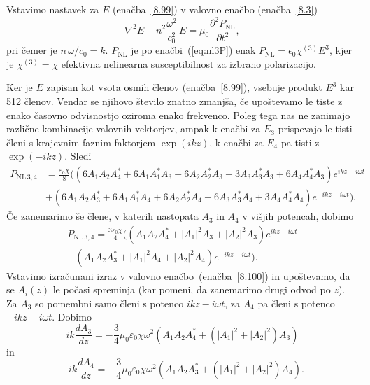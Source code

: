 Vstavimo nastavek za $E$ (enačba~\ref{8.99}) v valovno enačbo (enačba~\ref{8.3})
\begin{equation}
\nabla^{2}E+n^2\frac{\omega^{2}}{c_0^{2}}\, 
E=\mu_{0}\frac{\partial^2 P_{\mathrm{NL}}}{\partial t^2},
\label{8.100}
\end{equation}
pri čemer je $n\,\omega/c_0=k$. $P_{\textrm{NL}}$ je po enačbi~(\ref{eq:nl3P})
enak $P_\mathrm{NL}= \epsilon_{0}\chi^{(3)}E^3$, kjer je $\chi^{(3)} = \chi$
efektivna nelinearna susceptibilnost
za izbrano polarizacijo. 

Ker je $E$ zapisan kot vsota osmih členov
(enačba~\ref{8.99}), vsebuje produkt $E^3$ kar 512 členov. Vendar se njihovo število znatno zmanjša, 
če upoštevamo le tiste z enako časovno odvisnostjo oziroma enako frekvenco.
Poleg tega nas ne zanimajo različne kombinacije valovnih vektorjev, ampak k enačbi za $E_{3}$ 
prispevajo le tisti členi s krajevnim faznim faktorjem $\exp(ikz)$, 
k enačbi za $E_4$ pa tisti z $\exp(-ikz)$. Sledi
\begin{align}
P_{\mathrm{NL}\,3,4} &= \frac{\varepsilon_0\chi}{8} \big(
\left(6 A_1 A_2 A_4^*+ 6A_1 A_1^*A_3 + 6A_2A_2^*A_3 + 3 A_3A_3^*A_3 + 6 A_4 A_4^* A_3\right)
e^{i k z - i\omega t} \nonumber\\
&+
\left(6 A_1 A_2 A_3^*+6 A_1 A_1^*A_4 + 6A_2A_2^*A_4 + 6 A_3A_3^*A_4 + 3 A_4 A_4^* A_4\right)
e^{-i k z - i\omega t} \big).
\end{align}
Če zanemarimo še člene, v katerih nastopata $A_3$ in $A_4$ v višjih potencah, dobimo
\begin{align}
P_{\mathrm{NL}\,3,4} = \frac{3\varepsilon_0\chi}{4} \big(
\left( A_1 A_2 A_4^*+ |A_1|^2 A_3 + |A_2|^2 A_3 \right)
e^{i k z - i\omega t} \nonumber\\
+ 
\left( A_1 A_2 A_3^*+|A_1|^2 A_4 + |A_2|^2A_4 \right)
e^{-i k z - i\omega t} \big).
\end{align}
Vstavimo izračunani izraz v valovno enačbo~(enačba~\ref{8.100}) in upoštevamo, 
da se $A_i(z)$ le počasi 
spreminja (kar pomeni, da zanemarimo drugi odvod po $z$). Za $A_3$ so pomembni 
samo členi s potenco $ikz-i\omega t$, za $A_4$ pa členi s potenco $-ikz-i\omega t$. Dobimo 
\begin{equation}
i k \frac{dA_3}{dz} = - \frac{3}{4} \mu_0\varepsilon_0 \chi \omega^2 
\left( A_1 A_2 A_4^*+ (|A_1|^2 + |A_2|^2) A_3 \right)
\label{eq:opc1}
\end{equation}
in 
\begin{equation}
-i k \frac{dA_4}{dz} = - \frac{3}{4} \mu_0\varepsilon_0 \chi \omega^2 
\left( A_1 A_2 A_3^*+ (|A_1|^2 + |A_2|^2) A_4 \right).
\label{eq:opc2}
\end{equation}
